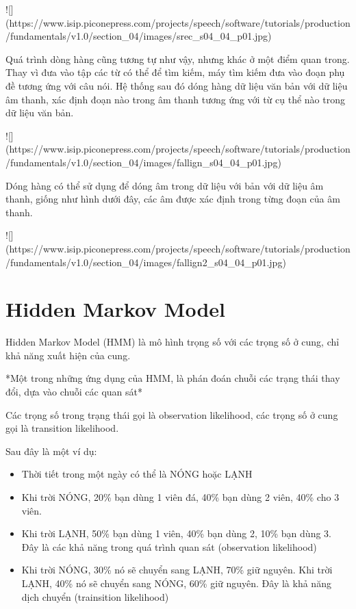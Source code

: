 ![](https://www.isip.piconepress.com/projects/speech/software/tutorials/production/fundamentals/v1.0/section_04/images/srec_s04_04_p01.jpg)

Quá trình dòng hàng cũng tương tự như vậy, nhưng khác ở một điểm quan trong. Thay vì đưa vào tập các từ có thể để tìm kiếm, máy tìm kiếm đưa vào đoạn phụ đề tương ứng với câu nói. Hệ thống sau đó dóng hàng dữ liệu văn bản với dữ liệu âm thanh, xác định đoạn nào trong âm thanh tương ứng với từ cụ thể nào trong dữ liệu văn bản.

![](https://www.isip.piconepress.com/projects/speech/software/tutorials/production/fundamentals/v1.0/section_04/images/fallign_s04_04_p01.jpg)

Dóng hàng có thể sử dụng để dóng âm trong dữ liệu với bản với dữ liệu âm thanh, giống như hình dưới đây, các âm được xác định trong từng đoạn của âm thanh.

![](https://www.isip.piconepress.com/projects/speech/software/tutorials/production/fundamentals/v1.0/section_04/images/fallign2_s04_04_p01.jpg)

\section{Hidden Markov Model}

Hidden Markov Model (HMM) là mô hình trọng số với các trọng số ở cung, chỉ khả năng xuất hiện của cung.

*Một trong những ứng dụng của HMM, là phán đoán chuỗi các trạng thái thay đổi, dựa vào chuỗi các quan sát*

Các trọng số trong trạng thái gọi là observation likelihood, các trọng số ở cung gọi là transition likelihood.

Sau đây là một ví dụ:

\begin{itemize}
  \item Thời tiết trong một ngày có thể là NÓNG hoặc LẠNH
  \item Khi trời NÓNG, 20\% bạn dùng 1 viên đá, 40\% bạn dùng 2 viên, 40\% cho 3 viên.
  \item Khi trời LẠNH, 50\% bạn dùng 1 viên, 40\% bạn dùng 2, 10\% bạn dùng 3. Đây là các khả năng trong quá trình quan sát (observation likelihood)
  \item Khi trời NÓNG, 30\% nó sẽ chuyển sang LẠNH, 70\% giữ nguyên. Khi trời LẠNH, 40\% nó sẽ chuyển sang NÓNG, 60\% giữ nguyên. Đây là khả năng dịch chuyển (trainsition likelihood)
\end{itemize}

